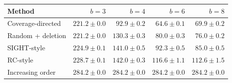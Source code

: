\begin{tabular}{lrrrr}
\toprule
Method & $b=3$ & $b=4$ & $b=6$ & $b=8$ \\
\midrule
Coverage-directed & $221.2 \pm 0.0$ & $92.9 \pm 0.2$ & $64.6 \pm 0.1$ & $69.9 \pm 0.2$ \\
Random + deletion & $221.2 \pm 0.0$ & $130.3 \pm 0.3$ & $80.0 \pm 0.3$ & $76.0 \pm 0.2$ \\
SIGHT-style & $224.9 \pm 0.1$ & $141.0 \pm 0.5$ & $92.3 \pm 0.5$ & $85.0 \pm 0.5$ \\
RC-style & $228.7 \pm 0.1$ & $142.0 \pm 0.3$ & $116.6 \pm 1.1$ & $112.6 \pm 1.5$ \\
Increasing order & $284.2 \pm 0.0$ & $284.2 \pm 0.0$ & $284.2 \pm 0.0$ & $284.2 \pm 0.0$ \\
\bottomrule
\end{tabular}
